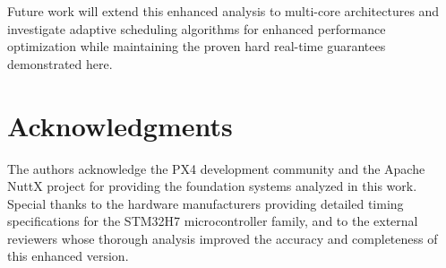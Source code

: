 \documentclass[11pt,a4paper]{article}
\theoremstyle{definition}
\theoremstyle{remark}
\begin{document}
Future work will extend this enhanced analysis to multi-core architectures and investigate adaptive scheduling algorithms for enhanced performance optimization while maintaining the proven hard real-time guarantees demonstrated here.

\section*{Acknowledgments}

The authors acknowledge the PX4 development community and the Apache NuttX project for providing the foundation systems analyzed in this work. Special thanks to the hardware manufacturers providing detailed timing specifications for the STM32H7 microcontroller family, and to the external reviewers whose thorough analysis improved the accuracy and completeness of this enhanced version.
\end{document}
